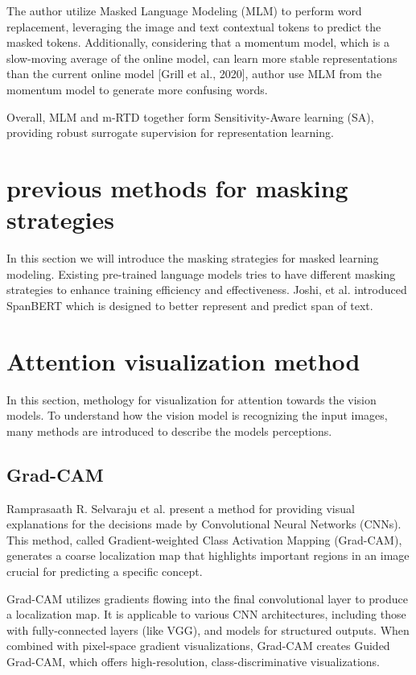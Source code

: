 The author utilize Masked Language Modeling (MLM) to perform word replacement, leveraging the image and text contextual tokens to predict the masked tokens. Additionally, considering that a momentum model, which is a slow-moving average of the online model, can learn more stable representations than the current online model [Grill et al., 2020], author use MLM from the momentum model to generate more confusing words. 

Overall, MLM and m-RTD together form Sensitivity-Aware learning (SA), providing robust surrogate supervision for representation learning.


\section{previous methods for masking strategies}

In this section we will introduce the masking strategies for masked learning modeling. Existing pre-trained language models tries to have different masking strategies to enhance training efficiency and effectiveness. 
Joshi, et al. \cite{10.1162/tacl_a_00300} introduced SpanBERT which is designed to better represent and predict span of text.


\section{Attention visualization method}
In this section, methology for visualization for attention towards the vision models. To understand how the vision model is recognizing the input images, many methods are introduced to describe the models perceptions.

\subsection{Grad-CAM}
Ramprasaath R. Selvaraju et al. present a method for providing visual explanations for the decisions made by Convolutional Neural Networks (CNNs). This method, called Gradient-weighted Class Activation Mapping (Grad-CAM), generates a coarse localization map that highlights important regions in an image crucial for predicting a specific concept.

Grad-CAM utilizes gradients flowing into the final convolutional layer to produce a localization map. It is applicable to various CNN architectures, including those with fully-connected layers (like VGG), and models for structured outputs. When combined with pixel-space gradient visualizations, Grad-CAM creates Guided Grad-CAM, which offers high-resolution, class-discriminative visualizations.

